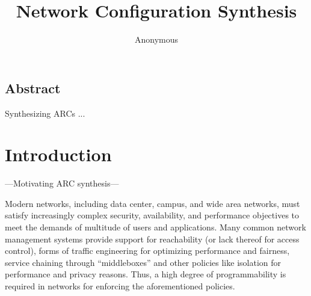 \documentclass{hotnets16}
\begin{document}
 {}
\date{}


\title{Network Configuration Synthesis}

\author{Anonymous}

\maketitle


\subsection*{Abstract}

Synthesizing ARCs ...

\section{Introduction}
---Motivating ARC synthesis---


Modern networks, including data center, campus, 
and wide area networks, 
must satisfy increasingly complex security, 
availability, and performance objectives to 
meet the demands of multitude of users and applications. 
Many common network management systems provide support
for reachability (or lack thereof for access control),
forms of traffic engineering for optimizing performance
and fairness, service chaining through ``middleboxes'' and
other policies like isolation for performance and privacy reasons.
Thus, a high degree of programmability is required in networks
for enforcing the aforementioned policies.
\end{document}
